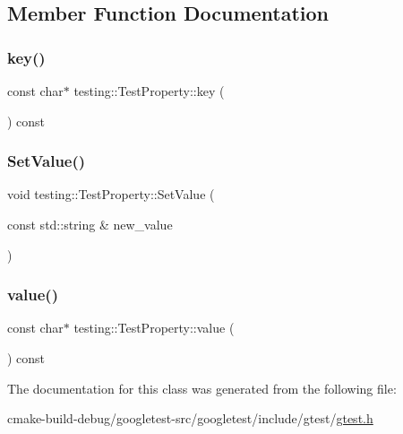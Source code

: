 \subsection{Member Function Documentation}
\mbox{\label{classtesting_1_1TestProperty_ad60435d4ad04ac030487d8998fc61c5f}} 
\subsubsection{\texorpdfstring{key()}{key()}}
{\footnotesize\ttfamily const char$\ast$ testing\+::\+Test\+Property\+::key (\begin{DoxyParamCaption}{ }\end{DoxyParamCaption}) const\hspace{0.3cm}{\ttfamily [inline]}}

\mbox{\label{classtesting_1_1TestProperty_a377245335d9f614cd06d1650e3358e1d}} 
\subsubsection{\texorpdfstring{SetValue()}{SetValue()}}
{\footnotesize\ttfamily void testing\+::\+Test\+Property\+::\+Set\+Value (\begin{DoxyParamCaption}\item[{const std\+::string \&}]{new\+\_\+value }\end{DoxyParamCaption})\hspace{0.3cm}{\ttfamily [inline]}}

\mbox{\label{classtesting_1_1TestProperty_ad423a07af33c88b0c9ed33ee74815a63}} 
\subsubsection{\texorpdfstring{value()}{value()}}
{\footnotesize\ttfamily const char$\ast$ testing\+::\+Test\+Property\+::value (\begin{DoxyParamCaption}{ }\end{DoxyParamCaption}) const\hspace{0.3cm}{\ttfamily [inline]}}



The documentation for this class was generated from the following file\+:\begin{DoxyCompactItemize}
\item 
cmake-\/build-\/debug/googletest-\/src/googletest/include/gtest/\mbox{\hyperlink{gtest_8h}{gtest.\+h}}\end{DoxyCompactItemize}
